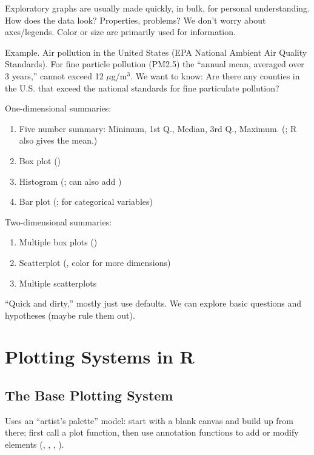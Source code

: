 Exploratory graphs are usually made quickly, in bulk, for personal understanding. How does the data look? Properties, problems? We don't worry about axes/legends. Color or size are primarily used for information.

Example. Air pollution in the United States (EPA National Ambient Air Quality Standards). For fine particle pollution (PM2.5) the ``annual mean, averaged over 3 years,'' cannot exceed 12 $\mu$g/m$^3$. We want to know: Are there any counties in the U.S. that exceed the national standards for fine particulate pollution?

One-dimensional summaries:

\begin{enumerate}
  \item Five number summary: Minimum, 1st Q., Median, 3rd Q., Maximum. (; R also gives the mean.)
  \item Box plot ()
  \item Histogram (; can also add )
  \item Bar plot (; for categorical variables)
\end{enumerate}

Two-dimensional summaries:

\begin{enumerate}
  \item Multiple box plots ()
  \item Scatterplot (, color for more dimensions)
  \item Multiple scatterplots
\end{enumerate}

``Quick and dirty,'' mostly just use defaults. We can explore basic questions and hypotheses (maybe rule them out).

\section{Plotting Systems in R}

\subsection*{The Base Plotting System}
Uses an ``artist's palette'' model: start with a blank canvas and build up from there; first call a plot function, then use annotation functions to add or modify elements (, , , ).

